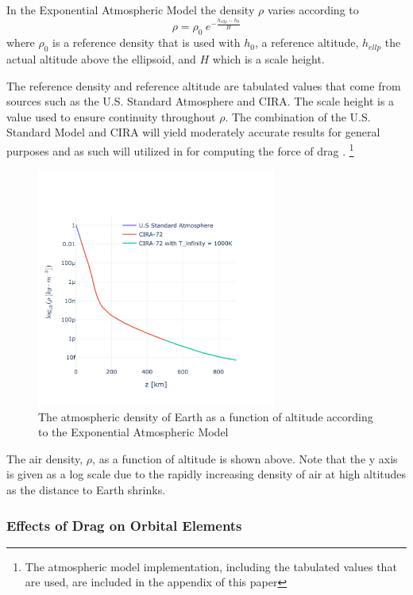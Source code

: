 \documentclass[a4paper, 12pt]{article}
\begin{document}
In the Exponential Atmospheric Model the density $\rho$ varies according to
\begin{equation}
	\rho = \rho_0\:e^{-\frac{h_{ellp} - h_0}{H}}
\end{equation}
where $\rho_0$ is a reference density that is used with $h_0$,  a reference altitude,  $h_{ellp}$ the actual altitude above the ellipsoid, and $H$ which is a scale height.

The reference density and reference altitude are tabulated values that come from sources such as the U.S. Standard Atmosphere and CIRA. The scale height is a value used to ensure continuity throughout $\rho$. The combination of the U.S. Standard Model and CIRA will yield moderately accurate results for general purposes and as such will utilized in for computing the force of drag \citep{vallado_d._2013}. \footnote{The atmospheric model implementation, including the tabulated values that are used, are included in the appendix of this paper}

\begin{figure}[H]
	\centering     %
	\vspace*{-1.5in}
	\includegraphics[width=0.7\textwidth]{Atmospheric_Density_v_Altitude}
	\caption{The atmospheric density of Earth as a function of altitude according to the Exponential Atmospheric Model}
\end{figure}

The air density, $\rho$, as a function of altitude is shown above. Note that the y axis is given as a log scale due to the rapidly increasing density of air at high altitudes as the distance to Earth shrinks.

\subsubsection{Effects of Drag on Orbital Elements}
\end{document}
